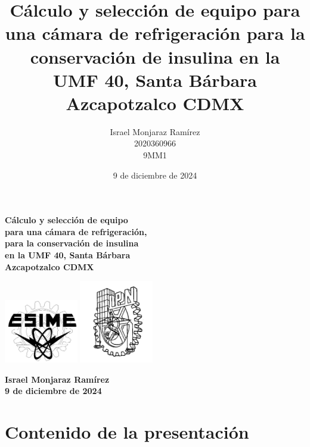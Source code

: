 \documentclass[dvipsnames]{beamer}
\title[Cámara de refrigeración para insulina en UMF40 Azcapotzalco CDMX]{\textbf{Cálculo y selección de equipo para una cámara de refrigeración para la conservación de insulina en la UMF 40, Santa Bárbara Azcapotzalco CDMX}}
\author{Israel Monjaraz Ramírez\\ 2020360966\\ 9MM1}
\date{9 de diciembre de 2024}
\begin{document}
	\justifying
\begin{frame}
	\thispagestyle{empty}  %
	
	
	
	
	\begin{center}
		\begin{footnotesize}		
		\textcolor{vino}{\textbf{Cálculo y selección de equipo}} \\
		\textcolor{vino}{\textbf{para una cámara de refrigeración,}} \\
		\textcolor{vino}{ \textbf{para la conservación de insulina}} \\
		 \textcolor{vino}{\textbf{en la UMF 40, Santa Bárbara} }\\ 
		\textcolor{vino}{ \textbf{Azcapotzalco CDMX}}
	\end{footnotesize}
	\end{center} 
	\begin{minipage}{\textwidth}
		\centering
		\includegraphics[width=0.241108\textwidth]{figures/esimeBN} 	\includegraphics[width=0.241108\textwidth]{figures/ipnlines}  
	\end{minipage}
	
\begin{center}
	\begin{small}
		
	\textcolor{vino}{	\textbf{Israel Monjaraz Ramírez}} \\
	\textcolor{vino}{	\textbf{9 de diciembre de 2024}}  
	\end{small}
\end{center}


\end{frame}

	\section[Contenido]{Contenido de la presentación}
	
\end{document}
